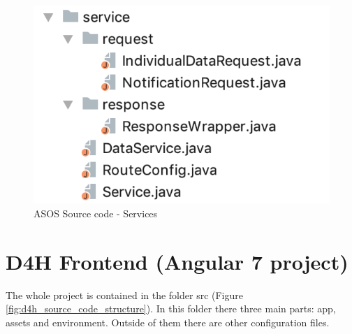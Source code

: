 \documentclass[a4paper, hidelinks, 12pt]{report}
\begin{document}
	\begin{figure}[H]
		\centering
		\includegraphics[scale=0.6]{images/backend/asos_source_code_services.png}
		\caption[ASOS Source code - Services]{ASOS Source code - Services}
		\label{fig:asos_source_code_services}
	\end{figure}


\section{D4H Frontend (Angular 7 project)}
The whole project is contained in the folder src (Figure \ref{fig:d4h_source_code_structure}). In this folder there three main parts: app, assets and environment. Outside of them there are other configuration files.
\end{document}
